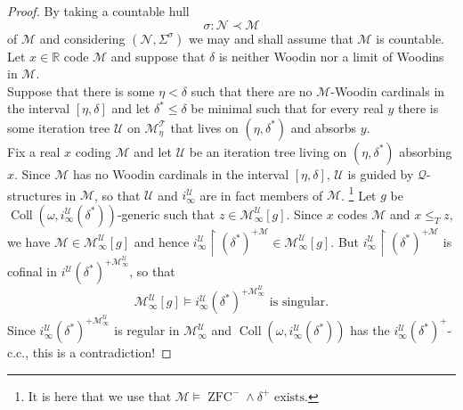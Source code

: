 \documentclass[12pt,a4paper]{article}
\theoremstyle{nicestyle}
\DeclareMathOperator{\zfc}{ZFC}
\DeclareMathOperator{\coll}{Coll}
\begin{document}
\begin{proof}
  By taking a countable hull
  \[
    \sigma \colon \mathcal{N} \prec \mathcal{M}
  \]
  of $\mathcal{M}$ and considering $(\mathcal{N}, \Sigma^{\sigma})$ we
  may and shall assume that $\mathcal{M}$ is countable. Let
  $x \in \mathbb{R}$ code $\mathcal{M}$ and suppose that $\delta$ is
  neither Woodin nor a limit of Woodins in $\mathcal{M}$. \\

  Suppose that there is some $\eta < \delta$ such that there are no
  $\mathcal{M}$-Woodin cardinals in the interval $[\eta, \delta]$ and
  let $\delta^{*} \le \delta$ be minimal such that for every real $y$
  there is some iteration tree $\mathcal{U}$ on
  $\mathcal{M}^{\mathcal{T}}_{\eta}$ that lives on
  $(\eta, \delta^{*})$ and absorbs $y$. \\
  Fix a real $x$ coding $\mathcal{M}$ and let $\mathcal{U}$ be an
  iteration tree living on $(\eta, \delta^{*})$ absorbing $x$. Since
  $\mathcal{M}$ has no Woodin cardinals in the interval
  $[\eta, \delta]$, $\mathcal{U}$ is guided by
  $\mathcal{Q}$-structures in $\mathcal{M}$, so that $\mathcal{U}$ and
  $i_{\infty}^{\mathcal{U}}$ are in fact members of
  $\mathcal{M}$. \footnote{It is here that we use that
    $\mathcal{M} \models \zfc^{-} \wedge \delta^{+} \text{ exists}$.}
  Let $g$ be
  $\coll(\omega,i^{\mathcal{U}}_{\infty} (\delta^{*}))$-generic such
  that $z \in \mathcal{M}^{\mathcal{U}}_{\infty}[g]$. Since $x$ codes
  $\mathcal{M}$ and $x \le_{T} z$, we have
  $\mathcal{M} \in \mathcal{M}^{\mathcal{U}}_{\infty}[g]$ and hence
  $i^{\mathcal{U}}_{\infty} \restriction (\delta^{*})^{+\mathcal{M}}
  \in \mathcal{M}^{\mathcal{U}}_{\infty}[g]$. But
  $i^{\mathcal{U}}_{\infty} \restriction (\delta^{*})^{+\mathcal{M}}$
  is cofinal in
  $i^{\mathcal{U}}(\delta^{*})^{+
    \mathcal{M}^{\mathcal{U}}_{\infty}}$, so that
  \[
    \mathcal{M}^{\mathcal{U}}_{\infty}[g] \models i^{\mathcal{U}}_{\infty}(\delta^{*})^{+
    \mathcal{M}^{\mathcal{U}}_{\infty}} \text{ is singular}.
  \]
  Since
  $i^{\mathcal{U}}_{\infty}(\delta^{*})^{+
    \mathcal{M}^{\mathcal{U}}_{\infty}}$ is regular in
  $\mathcal{M}^{\mathcal{U}}_{\infty}$ and
  $\coll(\omega, i^{\mathcal{U}}_{\infty}(\delta^{*}))$ has the
  $i^{\mathcal{U}}_{\infty}(\delta^{*})^{+}$-c.c., this is a
  contradiction!
\end{proof}
\end{document}
